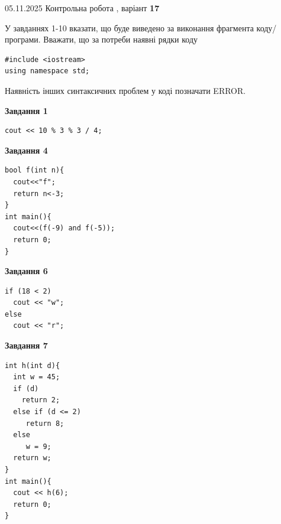 \documentclass[12pt, ukrainian]{article}
\begin{document}
\newpage

{\Large{05.11.2025 Контрольна робота , варіант  \No \textbf { 17 }\par}}
{
\begin {large}
У завданнях 1-10 вказати, що буде виведено за виконання фрагмента коду/про\-гра\-ми.
Вважати, що за потреби наявні рядки коду
\begin{verbatim}
#include <iostream>
using namespace std;
\end{verbatim}
Наявність інших синтаксичних проблем у коді позначати ERROR.

\begin{minipage}[t]{7.0cm}

\begin{center}
\textbf{Завдання 1}
\end{center}
\vspace{-8mm}

\begin{verbatim}
cout << 10 % 3 % 3 / 4;
\end{verbatim}



\begin{center}
\textbf{Завдання 4}
\end{center}
\vspace{-8mm}

\begin{verbatim}
bool f(int n){
  cout<<"f";
  return n<-3;
}
int main(){
  cout<<(f(-9) and f(-5));
  return 0;
}
\end{verbatim}



\begin{center}
\textbf{Завдання 6}
\end{center}
\vspace{-8mm}

\begin{verbatim}
if (18 < 2)
  cout << "w";
else
  cout << "r";
\end{verbatim}



\begin{center}
\textbf{Завдання 7}
\end{center}
\vspace{-8mm}

\begin{verbatim}
int h(int d){
  int w = 45;
  if (d)
    return 2;
  else if (d <= 2)
     return 8;
  else
     w = 9;
  return w;
}
int main(){
  cout << h(6);
  return 0;
}
\end{verbatim}


\end{minipage}
\end{large}}
\end{document}
